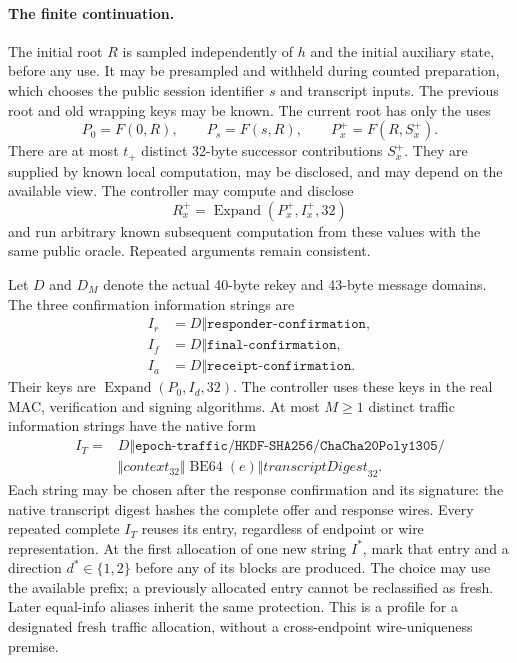 \documentclass[pdflatex]{sn-jnl}
\theoremstyle{thmstyleone}
\theoremstyle{thmstylethree}
\theoremstyle{thmstyletwo}
\begin{document}
\paragraph{The finite continuation.}
The initial root $R$ is sampled independently of $h$ and the initial
auxiliary state, before any use. It may be presampled and withheld during
counted preparation, which chooses the public session identifier $s$ and
transcript inputs. The previous root and old wrapping keys may be known.
The current root has only the uses
\begin{equation}
 P_0=F(0,R),\qquad P_s=F(s,R),\qquad P_x^+=F(R,S_x^+).
 \label{eq:joint-root-uses}
\end{equation}
There are at most $t_+$ distinct 32-byte successor contributions $S_x^+$.
They are supplied by known local computation, may be disclosed, and may
depend on the available view. The controller may compute and disclose
\[
 R_x^+=\operatorname{Expand}(P_x^+,I_x^+,32)
\]
and run arbitrary known subsequent computation from these values with the
same public oracle. Repeated arguments remain consistent.

Let $D$ and $D_M$ denote the actual 40-byte rekey and 43-byte message domains.
The three confirmation information strings are
\[
\begin{aligned}
 I_r&=D\Vert\texttt{responder-confirmation},\\
 I_f&=D\Vert\texttt{final-confirmation},\\
 I_a&=D\Vert\texttt{receipt-confirmation}.
\end{aligned}
\]
Their keys are $\operatorname{Expand}(P_0,I_d,32)$. The controller uses
these keys in the real MAC, verification and signing algorithms.
At most $M\ge1$ distinct traffic information strings have the native form
\begin{equation}
\begin{split}
 I_T={}&D\Vert\texttt{epoch-traffic/HKDF-SHA256/ChaCha20Poly1305/}\\
 &\Vert\mathit{context}_{32}\Vert\operatorname{BE64}(e)
 \Vert\mathit{transcriptDigest}_{32}.
\end{split}
 \label{eq:joint-traffic-info}
\end{equation}
Each string may be chosen after the response confirmation and its signature: the
native transcript digest hashes the complete offer and response wires.
Every repeated complete $I_T$ reuses its entry, regardless of endpoint or
wire representation. At the first allocation of one new string $I^*$,
mark that entry and a direction $d^*\in\{1,2\}$ before any of its blocks
are produced. The choice may use the available prefix; a previously
allocated entry cannot be reclassified as fresh. Later equal-info
aliases inherit the same protection. This is a profile for a designated
fresh traffic allocation, without a cross-endpoint wire-uniqueness premise.
\end{document}
